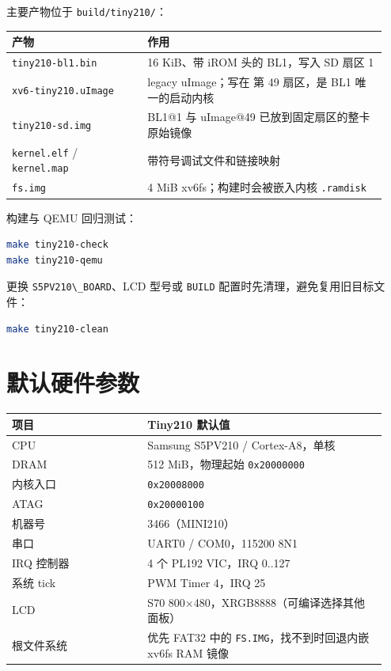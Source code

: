 主要产物位于 \passthrough{\lstinline!build/tiny210/!}：

{\def\LTcaptype{none} %
\begin{longtable}[]{@{}p{0.34\linewidth}p{0.60\linewidth}@{}}
\toprule\noalign{}
产物 & 作用 \\
\midrule\noalign{}
\endhead
\bottomrule\noalign{}
\endlastfoot
\passthrough{\lstinline!tiny210-bl1.bin!} & 16 KiB、带 iROM 头的
BL1，写入 SD 扇区 1 \\
\passthrough{\lstinline!xv6-tiny210.uImage!} & legacy uImage；写在
第 49 扇区，是 BL1 唯一的启动内核 \\
\passthrough{\lstinline!tiny210-sd.img!} & BL1@1 与 uImage@49
已放到固定扇区的整卡原始镜像 \\
\passthrough{\lstinline!kernel.elf!} /
\passthrough{\lstinline!kernel.map!} & 带符号调试文件和链接映射 \\
\passthrough{\lstinline!fs.img!} & 4 MiB xv6fs；构建时会被嵌入内核
\passthrough{\lstinline!.ramdisk!} \\
\end{longtable}
}

构建与 QEMU 回归测试：

\begin{lstlisting}[language=sh]
make tiny210-check
make tiny210-qemu
\end{lstlisting}

更换 \passthrough{\lstinline!S5PV210\_BOARD!}、LCD 型号或
\passthrough{\lstinline!BUILD!} 配置时先清理，避免复用旧目标文件：

\begin{lstlisting}[language=sh]
make tiny210-clean
\end{lstlisting}

\section{默认硬件参数}\label{ux9ed8ux8ba4ux786cux4ef6ux53c2ux6570}

{\def\LTcaptype{none} %
\begin{longtable}[]{@{}p{0.34\linewidth}p{0.60\linewidth}@{}}
\toprule\noalign{}
项目 & Tiny210 默认值 \\
\midrule\noalign{}
\endhead
\bottomrule\noalign{}
\endlastfoot
CPU & Samsung S5PV210 / Cortex-A8，单核 \\
DRAM & 512 MiB，物理起始 \passthrough{\lstinline!0x20000000!} \\
内核入口 & \passthrough{\lstinline!0x20008000!} \\
ATAG & \passthrough{\lstinline!0x20000100!} \\
机器号 & 3466（MINI210） \\
串口 & UART0 / COM0，115200 8N1 \\
IRQ 控制器 & 4 个 PL192 VIC，IRQ 0..127 \\
系统 tick & PWM Timer 4，IRQ 25 \\
LCD & S70 800×480，XRGB8888（可编译选择其他面板） \\
根文件系统 & 优先 FAT32 中的
\passthrough{\lstinline!FS.IMG!}，找不到时回退内嵌 xv6fs RAM 镜像 \\
\end{longtable}
}

